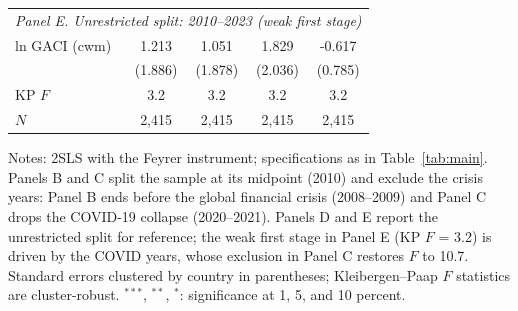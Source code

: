 \documentclass[12pt]{article}
\begin{document}
\begin{table}[H]
{\begin{threeparttable}
\begin{tabular}{lcccc}
\midrule
\multicolumn{5}{l}{\textit{Panel E. Unrestricted split: 2010--2023 (weak first stage)}} \\
  ln GACI (cwm) & 1.213 & 1.051 & 1.829 & -0.617 \\
   & (1.886) & (1.878) & (2.036) & (0.785) \\
  KP $F$ & 3.2 & 3.2 & 3.2 & 3.2 \\
  $N$ & 2,415 & 2,415 & 2,415 & 2,415 \\
\bottomrule
\end{tabular}
\begin{tablenotes}[flushleft]
\footnotesize
\item Notes: 2SLS with the Feyrer instrument; specifications as in Table~\ref{tab:main}. Panels B and C split the sample at its midpoint (2010) and exclude the crisis years: Panel B ends before the global financial crisis (2008--2009) and Panel C drops the COVID-19 collapse (2020--2021). Panels D and E report the unrestricted split for reference; the weak first stage in Panel E (KP $F$ = 3.2) is driven by the COVID years, whose exclusion in Panel C restores $F$ to 10.7. Standard errors clustered by country in parentheses; Kleibergen--Paap $F$ statistics are cluster-robust. $^{***}$, $^{**}$, $^{*}$: significance at 1, 5, and 10 percent.
\end{tablenotes}
\end{threeparttable}}
\end{table}
\end{document}
